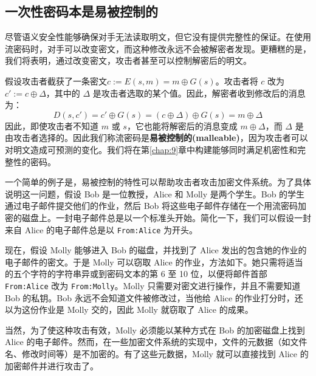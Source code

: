 \subsection{一次性密码本是易被控制的}

尽管语义安全性能够确保对手无法读取明文，但它没有提供完整性的保证。在使用流密码时，对手可以改变密文，而这种修改永远不会被解密者发现。更糟糕的是，我们将表明，通过改变密文，攻击者甚至可以控制解密后的明文。

假设攻击者截获了一条密文$c:=E(s,m)=m\oplus G(s)$。攻击者将 $c$ 改为 $c':=c\oplus\Delta$，其中的 $\Delta$ 是攻击者选取的某个值。因此，解密者收到修改后的消息为：
$$
D(s,c')=c'\oplus G(s)=(c\oplus\Delta)\oplus G(s)=m\oplus\Delta
$$
因此，即使攻击者不知道 $m$ 或 $s$，它也能将解密后的消息变成 $m\oplus\Delta$，而 $\Delta$ 是由攻击者选择的。因此我们称流密码是\textbf{易被控制的(malleable)}，因为攻击者可以对明文造成可预测的变化。我们将在第\ref{chap:9}章中构建能够同时满足机密性和完整性的密码。

一个简单的例子是，易被控制的特性可以帮助攻击者攻击加密文件系统。为了具体说明这一问题，假设 Bob 是一位教授，Alice 和 Molly 是两个学生。Bob 的学生通过电子邮件提交他们的作业，然后 Bob 将这些电子邮件存储在一个用流密码加密的磁盘上。一封电子邮件总是以一个标准头开始。简化一下，我们可以假设一封来自 Alice 的电子邮件总是以 \texttt{From:Alice} 为开头。

现在，假设 Molly 能够进入 Bob 的磁盘，并找到了 Alice 发出的包含她的作业的电子邮件的密文。于是 Molly 可以窃取 Alice 的作业，方法如下。她只需将适当的五个字符的字符串异或到密码文本的第 6 至 10 位，以便将邮件首部 \texttt{From:Alice} 改为 \texttt{From:Molly}。Molly 只需要对密文进行操作，并且不需要知道 Bob 的私钥。Bob 永远不会知道文件被修改过，当他给 Alice 的作业打分时，还以为这份作业是 Molly 交的，因此 Molly 就窃取了 Alice 的成果。

当然，为了使这种攻击有效，Molly 必须能以某种方式在 Bob 的加密磁盘上找到 Alice 的电子邮件。然而，在一些加密文件系统的实现中，文件的元数据（如文件名、修改时间等）是不加密的。有了这些元数据，Molly 就可以直接找到 Alice 的加密邮件并进行攻击了。